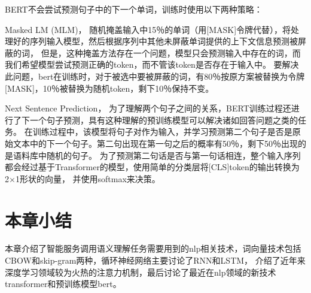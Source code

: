BERT不会尝试预测句子中的下一个单词，训练时使用以下两种策略：

Masked LM (MLM)，
随机掩盖输入中15％的单词（用[MASK]令牌代替），将处理好的序列输入模型，然后根据序列中其他未屏蔽单词提供的上下文信息预测被屏蔽的词，
但是，这种掩盖方法存在一个问题，模型只会预测输入中存在的词，而我们希望模型尝试预测正确的token，而不管该token是否存在于输入中。
要解决此问题，bert在训练时，对于被选中要被屏蔽的词，有80％按原方案被替换为令牌[MASK]，10％被替换为随机token，剩下10％保持不变。

Next Sentence Prediction，
为了理解两个句子之间的关系，BERT训练过程还进行了下一个句子预测，具有这种理解的预训练模型可以解决诸如回答问题之类的任务。
在训练过程中，该模型将句子对作为输入，并学习预测第二个句子是否是原始文本中的下一个句子。第二句出现在第一句之后的概率有50％，剩下50％出现的是语料库中随机的句子。
为了预测第二句话是否与第一句话相连，整个输入序列都会经过基于Transformer的模型，使用简单的分类层将[CLS]token的输出转换为2×1形状的向量，
并使用softmax来决策。

\section{本章小结}
本章介绍了智能服务调用语义理解任务需要用到的nlp相关技术，词向量技术包括CBOW和skip-gram两种，循环神经网络主要讨论了RNN和LSTM，
介绍了近年来深度学习领域较为火热的注意力机制，最后讨论了最近在nlp领域的新技术transformer和预训练模型bert。